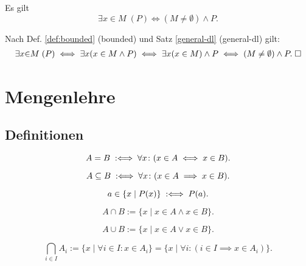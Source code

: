 \begin{Satz}
Es gilt
\[\exists x{\in}M\;(P) \iff (M\ne\emptyset)\land P.\]
\end{Satz}

\begin{Beweis}
Nach Def. \ref{def:bounded} (bounded) und Satz
\ref{general-dl} (general-dl) gilt:
\begin{gather*}
\exists x{\in}M\;(P) \iff \exists x(x\in M\land P)
\iff \exists x(x\in M)\land P\iff (M\ne\emptyset)\land P.\;\square
\end{gather*}
\end{Beweis}

\newpage
\section{Mengenlehre}
\subsection{Definitionen}

\begin{Definition}
\label{def:seteq}
\[A=B \;:\Longleftrightarrow\; \forall x\colon (x\in A\iff x\in B).\]
\end{Definition}

\begin{Definition}%
\label{def:subseteq}
\[A\subseteq B \;:\Longleftrightarrow\; \forall x\colon (x\in A\implies x\in B).\]
\end{Definition}

\begin{Definition}\label{def:filter}
\[a\in\{x\mid P(x)\} \;:\Longleftrightarrow\; P(a).\]
\end{Definition}

\begin{Definition}%
\label{def:cap}
\[A\cap B := \{x\mid x\in A\land x\in B\}.\]
\end{Definition}

\begin{Definition}%
\label{def:cup}
\[A\cup B := \{x\mid x\in A\lor x\in B\}.\]
\end{Definition}

\begin{Definition}\label{def:intersection}
\[\bigcap_{i\in I} A_i := \{x\mid \forall i{\in}I\colon x\in A_i\}
= \{x\mid \forall i\colon (i\in I\implies x\in A_i)\}.\]
\end{Definition}

